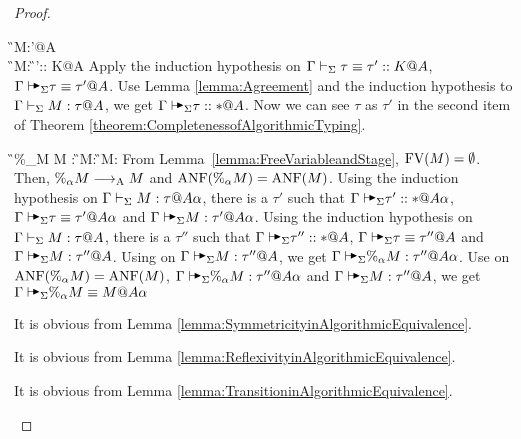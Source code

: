 \begin{proof}
    \begin{rneqncase}{\TConv}{
            \G\V M:\tau'@A \\
            \G\V M:\tau@A {}
            \G\V \tau\equiv \tau':: K@A
        }
        Apply the induction hypothesis on \( \Gamma\vdash_\Sigma \tau\equiv \tau':: K@A \), \(
        \G\AVS \tau\equiv \tau' @A \).  Use Lemma \ref{lemma:Agreement} and the
        induction hypothesis to \( \Gamma\vdash_\Sigma M : \tau @A \), we get \( \G\AVS \tau
        :: * @ A \). Now we can see \( \tau \) as \( \tau' \) in the second
        item of Theorem \ref{theorem:CompletenessofAlgorithmicTyping}.
    \end{rneqncase}
    \begin{rneqncase}{\QPercent}{
            \G\V \%_\alpha M \E M : 
            \G\V M: 
            \G\V M:\tau@A
        }
        From Lemma~\ref{lemma:FreeVariableandStage}, \( \text{FV}(M) = \emptyset \).
        Then, \( \%_\alpha M \longrightarrow_{\text{A}} M \) and \( \text{ANF}(\%_\alpha M) = \text{ANF}(M) \).
        Using the induction hypothesis on \( \G\V M:\tau@{A\alpha} \), there is
        a \( \tau' \) such that \( \G \AVS \tau' :: * @ A\alpha \), \( \G \AVS
        \tau \E \tau' @ A\alpha \) and \( \G \AVS M : \tau' @ A\alpha \).
        Using the induction hypothesis on \( \G\V M:\tau@A \), there is a \(
        \tau'' \) such that \( \G \AVS \tau'' :: * @ A \), \( \G \AVS \tau \E
        \tau'' @ A \) and \( \G \AVS M : \tau'' @ A \).  Using \TACsp on \( \G
        \AVS M : \tau'' @ A \), we get \( \G \AVS \%_\alpha M : \tau'' @
        A\alpha \).  Use \QAANF on \( \text{ANF}(\%_\alpha M) = \text{ANF}(M) \), \( \G
        \AVS \%_\alpha M : \tau'' @ A\alpha \) and \( \G \AVS M : \tau'' @ A
        \), we get \( \G \AVS \%_\alpha M \E M @ {A\alpha} \)
    \end{rneqncase}
    \begin{rneqncase}{\QKSym}{}
        It is obvious from Lemma \ref{lemma:SymmetricityinAlgorithmicEquivalence}.
    \end{rneqncase}
    \begin{rneqncase}{\QKRefl}{}
        It is obvious from Lemma \ref{lemma:ReflexivityinAlgorithmicEquivalence}.
    \end{rneqncase}
    \begin{rneqncase}{\QKTrans}{}
        It is obvious from Lemma \ref{lemma:TransitioninAlgorithmicEquivalence}.
    \end{rneqncase}
\end{proof}
